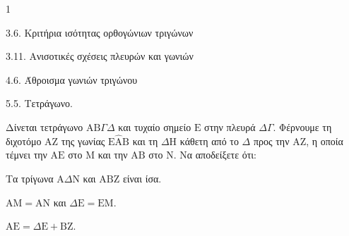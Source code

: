 \begin{ylh}{1}
    \item 3.6. Κριτήρια ισότητας ορθογώνιων τριγώνων
    \item 3.11. Ανισοτικές σχέσεις πλευρών και γωνιών
    \item 4.6. Άθροισμα γωνιών τριγώνου
    \item 5.5. Τετράγωνο.
\end{ylh}
Δίνεται τετράγωνο $\mathrm{A}\mathrm{B}\Gamma\Delta$ και τυχαίο σημείο $\mathrm{E}$ στην πλευρά $\Delta\Gamma$. Φέρνουμε τη διχοτόμο $\mathrm{A}\mathrm{Z}$ της γωνίας $\mathrm{E}\hat{\mathrm{A}}\mathrm{B}$ και τη $\Delta\mathrm{H}$ κάθετη από το $\Delta$ προς την $\mathrm{A}\mathrm{Z}$, η οποία τέμνει την $\mathrm{A}\mathrm{E}$ στο $\mathrm{M}$ και την $\mathrm{A}\mathrm{B}$ στο $\mathrm{N}$.
Να αποδείξετε ότι:
\begin{alist}
    \item Τα τρίγωνα $\mathrm{A}\Delta\mathrm{N}$ και $\mathrm{A}\mathrm{B}\mathrm{Z}$ είναι ίσα. 
    \item $\mathrm{A}\mathrm{M} = \mathrm{A}\mathrm{N}$ και $\Delta\mathrm{E} = \mathrm{E}\mathrm{M}$. 
    \item $\mathrm{A}\mathrm{E} = \Delta\mathrm{E} + \mathrm{B}\mathrm{Z}$. 
\end{alist}
